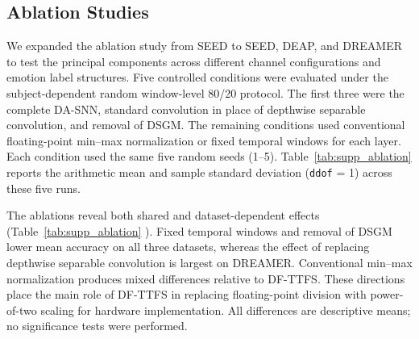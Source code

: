 \documentclass[12pt]{article}
\providecommand{\DIFaddtex}[1]{{\protect\color{blue}\sf #1}}
\providecommand{\DIFadd}[1]{\texorpdfstring{\DIFaddtex{#1}}{#1}}
\providecommand{\DIFaddbegin}{}
\providecommand{\DIFaddend}{}
\begin{document}
\subsection{\DIFadd{Ablation Studies}}

\DIFadd{We expanded the ablation study from SEED to SEED, DEAP, and DREAMER to test the principal components across different channel configurations and emotion label structures. Five controlled conditions were evaluated under the subject-dependent random window-level 80/20 protocol. The first three were the complete DA-SNN, standard convolution in place of depthwise separable convolution, and removal of DSGM. The remaining conditions used }\DIFaddend conventional floating-point  \DIFaddbegin \DIFadd{min--max normalization or fixed temporal windows for each layer. Each condition used the same five random seeds (1--5). Table~\ref{tab:supp_ablation} reports the arithmetic mean and sample standard deviation (\texttt{ddof} = 1) across these five runs}\DIFaddend .

\DIFaddbegin \DIFadd{The ablations reveal both shared and dataset-dependent effects (}\DIFaddend Table~\ref{tab:supp_ablation} \DIFaddbegin \DIFadd{). Fixed temporal windows and removal of DSGM lower mean accuracy on all three datasets, whereas the effect of replacing depthwise separable convolution is largest on DREAMER. Conventional min--max normalization produces mixed differences relative to DF-TTFS. These directions place the main role of DF-TTFS in replacing }\DIFaddend floating-point  \DIFaddbegin \DIFadd{division with power-of-two scaling for hardware implementation. All differences are descriptive means; no significance tests were performed.
}
\end{document}
